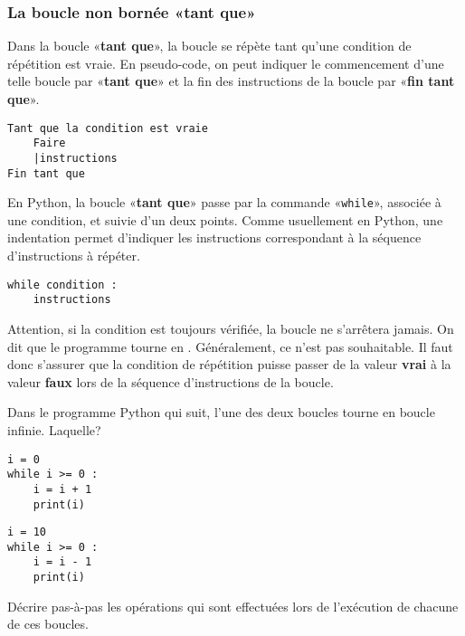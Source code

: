 \subsubsection{La boucle non bornée «{\ttfamily\bf tant que}»}

Dans la boucle «{\ttfamily\bf tant que}», la boucle se répète tant qu'une condition de répétition est vraie. En pseudo-code, on peut indiquer le commencement d'une telle boucle par «{\ttfamily\bf tant que}» et la fin des instructions de la boucle par «{\ttfamily\bf fin tant que}».
\begin{center}
	\begin{varwidth}[t]{.5\textwidth}
		\begin{lstlisting}[language=Pseudo,linewidth=8cm]
Tant que la condition est vraie
    Faire
    |instructions
Fin tant que\end{lstlisting}\end{varwidth}\end{center}

En Python, la boucle «{\ttfamily\bf tant que}» passe par la commande «\texttt{while}», associée à une condition, et suivie d'un deux points. Comme usuellement en Python, une indentation permet d'indiquer les instructions correspondant à la séquence d'instructions à répéter.
\begin{center}\begin{varwidth}[t]{.5\textwidth}
		\begin{lstlisting}[language=iPython,linewidth=5cm]
while condition :
    instructions
\end{lstlisting}\end{varwidth}\end{center}

Attention, si la condition est toujours vérifiée, la boucle ne s'arrêtera jamais. On dit que le programme tourne en . Généralement, ce n'est pas souhaitable. Il faut donc s'assurer que la condition de répétition puisse passer de la valeur {\ttfamily\bf vrai} à la valeur {\ttfamily\bf faux} lors de la séquence d'instructions de la boucle.

\begin{exercise}
	Dans le programme Python qui suit, l'une des deux boucles tourne en boucle infinie. Laquelle?
	\begin{center}
	\begin{varwidth}[t]{.5\textwidth}
		\begin{lstlisting}[language=iPython,linewidth = 4cm]
i = 0
while i >= 0 :
    i = i + 1
    print(i)\end{lstlisting}
\end{varwidth}\hspace{3cm}
\begin{varwidth}[t]{.5\textwidth}
\begin{lstlisting}[language=iPython,linewidth = 4cm]
i = 10
while i >= 0 :
    i = i - 1
    print(i)
\end{lstlisting}\end{varwidth}\end{center}
Décrire pas-à-pas les opérations qui sont effectuées lors de l'exécution de chacune de ces boucles.
\end{exercise}

